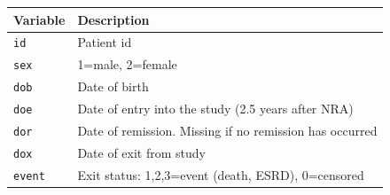 \documentclass[
]{book}
\begin{document}
\begin{longtable}[]{@{}ll@{}}
\toprule\noalign{}
Variable & Description \\
\midrule\noalign{}
\endhead
\bottomrule\noalign{}
\endlastfoot
\texttt{id} & Patient id \\
\texttt{sex} & 1=male, 2=female \\
\texttt{dob} & Date of birth \\
\texttt{doe} & Date of entry into the study (2.5 years after NRA) \\
\texttt{dor} & Date of remission. Missing if no remission has occurred \\
\texttt{dox} & Date of exit from study \\
\texttt{event} & Exit status: 1,2,3=event (death, ESRD), 0=censored \\
\end{longtable}
\end{document}
